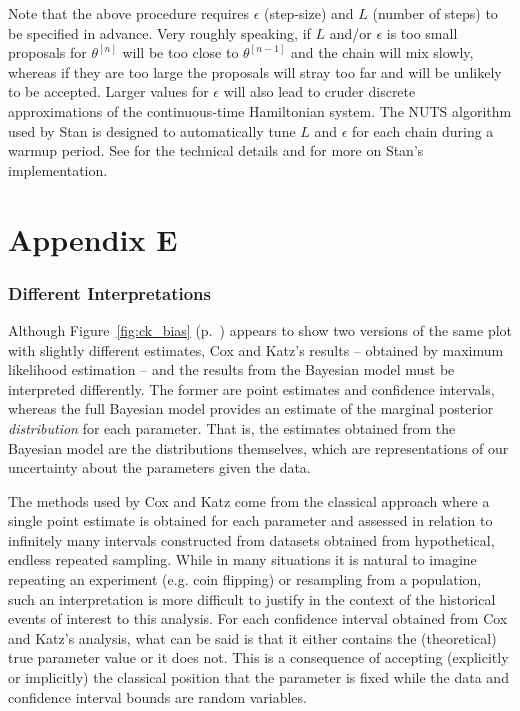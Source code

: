 Note that the above procedure requires $\epsilon$ (step-size) and $L$ (number of steps) to be specified in 
advance. Very roughly speaking, if $L$ and/or $\epsilon$ is too small proposals for $\theta^{[n]}$ will be too 
close to $\theta^{[n-1]}$ and the chain will mix slowly, whereas if they are too large the proposals will stray 
too far and will be unlikely to be accepted. Larger values for $\epsilon$ will also lead to cruder discrete
approximations of the continuous-time Hamiltonian system. The NUTS algorithm  
used by Stan is designed to automatically tune $L$ and $\epsilon$ for each chain during a warmup period. 
See  for the technical details and  for more 
on Stan's implementation. 




\chapter*{Appendix E}\label{AppendixE}
\vspace{-1.75cm}
\subsection*{Different Interpretations}

Although Figure~\ref{fig:ck_bias} (p.~\pageref{fig:ck_bias}) appears to show two versions of the same plot with
slightly different estimates, Cox and Katz's results -- obtained by maximum likelihood estimation --
and the results from the Bayesian model must be interpreted differently. The former are point estimates 
and confidence intervals, whereas the full Bayesian model provides an estimate of the marginal posterior 
{\it distribution} for each parameter. That is, the estimates obtained from the Bayesian model are the 
distributions themselves, which are representations of our uncertainty about the parameters 
given the data. 

The methods used by Cox and Katz come from the classical approach where a single point 
estimate is obtained for each parameter and assessed in relation to infinitely many intervals 
constructed from datasets obtained from hypothetical, endless repeated sampling. While in many 
situations it is natural to imagine repeating an experiment (e.g. coin flipping) or resampling from 
a population, such an interpretation is more difficult to justify in the context of the historical 
events of interest to this analysis. For each confidence interval obtained from Cox and Katz's analysis, 
what can be said is that it either contains the (theoretical) true parameter value or it does not. This is 
a consequence of accepting (explicitly or implicitly) the classical position that the parameter is fixed 
while the data and confidence interval bounds are random variables. 

